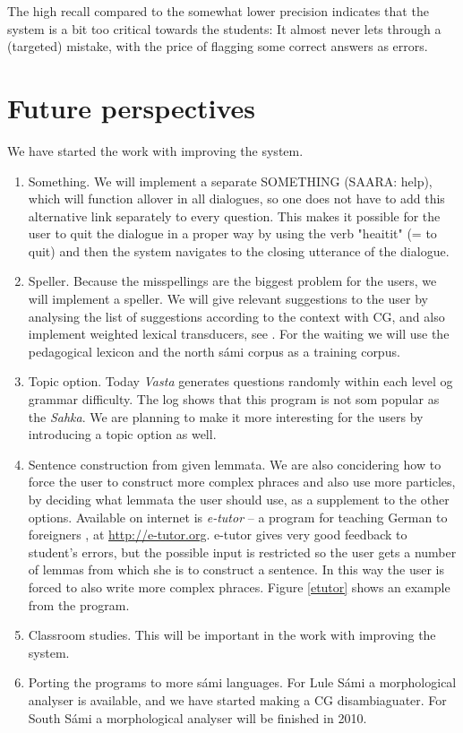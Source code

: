 \documentclass[11pt]{article}
\begin{document}
The high recall compared to the somewhat lower precision indicates that the system is a bit too critical towards the students: It almost never lets through a (targeted) mistake, with the price of flagging some correct answers as errors.
 
\section{Future perspectives}
We have started the work with improving the system.
\begin{enumerate}
\item Something. We will implement a separate SOMETHING (SAARA: help), which will function allover in all dialogues, so one does not have to add this alternative link separately to every question. This makes it possible for the user to quit the dialogue in a proper way by using the verb "heaitit" (= to quit) and then the system navigates to the closing utterance of the dialogue. 
\item Speller. Because the misspellings are the biggest problem for the users, we will implement a speller. We will give relevant suggestions to the user by analysing the list of suggestions according to the context with CG, and also implement weighted lexical transducers, see \cite{Linden:09}. For the waiting we will use the pedagogical lexicon and the north sámi corpus as a training corpus.
\item Topic option. Today \textit{Vasta} generates questions randomly within each level og grammar difficulty. The log shows that this program is not som popular as the \textit{Sahka}. We are planning to make it more interesting for the users by introducing a topic option as well.
\item Sentence construction from given lemmata. We are also concidering how to force the user to construct more complex phraces and also use more particles, by deciding what lemmata the user should use, as a supplement to the other options. Available on internet is \textit{e-tutor} -- a program for teaching German to foreigners \cite{Heift:01,Heift:02}, at \url{http://e-tutor.org}. e-tutor gives very good feedback to student's errors, but the possible input is restricted so the user gets a number of lemmas from which she is to construct a sentence. In this way the user is forced to also write more complex phraces. Figure \ref{etutor} shows an example from the program.
\item Classroom studies. This will be important in the work with improving the system.
\item Porting the programs to more sámi languages. For Lule Sámi a morphological analyser is available, and we have started making a CG disambiaguater. For South Sámi a morphological analyser will be finished in 2010. 
  \end{enumerate} 
  \vspace{0.7cm}
\end{document}
